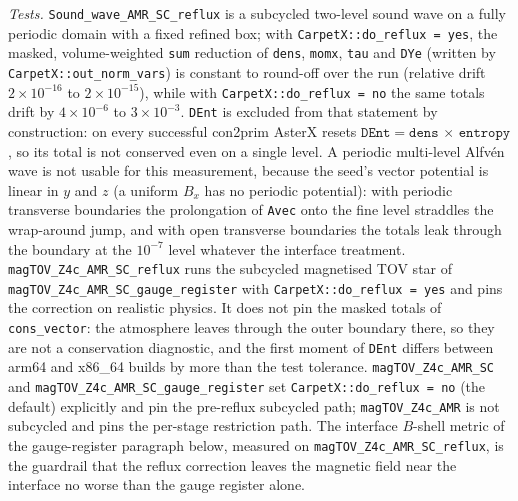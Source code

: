 \emph{Tests.} \texttt{Sound\_wave\_AMR\_SC\_reflux} is a subcycled two-level
sound wave on a fully periodic domain with a fixed refined box; with
\texttt{CarpetX::do\_reflux = yes}, the masked, volume-weighted \texttt{sum} reduction of \texttt{dens},
\texttt{momx}, \texttt{tau} and \texttt{DYe} (written by
\texttt{CarpetX::out\_norm\_vars}) is constant to round-off over the run
(relative drift $2\times10^{-16}$ to $2\times10^{-15}$), while with
\texttt{CarpetX::do\_reflux = no} the same totals drift by $4\times10^{-6}$
to $3\times10^{-3}$. \texttt{DEnt} is excluded from that statement by
construction: on every successful con2prim AsterX resets
$\texttt{DEnt} = \texttt{dens}\,\times\,\texttt{entropy}$, so its total is not
conserved even on a single level. A periodic multi-level Alfv\'en wave is not
usable for this measurement, because the seed's vector potential is linear in
$y$ and $z$ (a uniform $B_x$ has no periodic potential): with periodic
transverse boundaries the prolongation of \texttt{Avec} onto the fine level
straddles the wrap-around jump, and with open transverse boundaries the
totals leak through the boundary at the $10^{-7}$ level whatever the
interface treatment. \texttt{magTOV\_Z4c\_AMR\_SC\_reflux} runs the
subcycled magnetised TOV star of \texttt{magTOV\_Z4c\_AMR\_SC\_gauge\_register}
with \texttt{CarpetX::do\_reflux = yes} and pins the correction on realistic physics. It does
not pin the masked totals of \texttt{cons\_vector}: the atmosphere leaves
through the outer boundary there, so they are not a conservation diagnostic,
and the first moment of \texttt{DEnt} differs between arm64 and x86\_64
builds by more than the test tolerance. \texttt{magTOV\_Z4c\_AMR\_SC} and
\texttt{magTOV\_Z4c\_AMR\_SC\_gauge\_register} set
\texttt{CarpetX::do\_reflux = no} (the default) explicitly and pin the pre-reflux subcycled
path; \texttt{magTOV\_Z4c\_AMR} is not subcycled and pins the per-stage
restriction path. The interface $B$-shell metric of the gauge-register
paragraph below, measured on \texttt{magTOV\_Z4c\_AMR\_SC\_reflux}, is the
guardrail that the reflux correction leaves the magnetic field near the
interface no worse than the gauge register alone.

